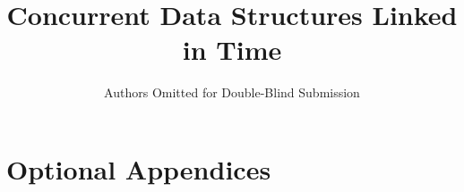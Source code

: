 \documentclass[a4paper,UKenglish]{lipics-v2016}
\title{Concurrent Data Structures Linked in Time}
\author{Authors Omitted for Double-Blind Submission}
\theoremstyle{definition}
\begin{document}
\maketitle

\begin{abstract}

\end{abstract}














\newpage   
\appendix
\section*{Optional Appendices}


%
%
\end{document}
